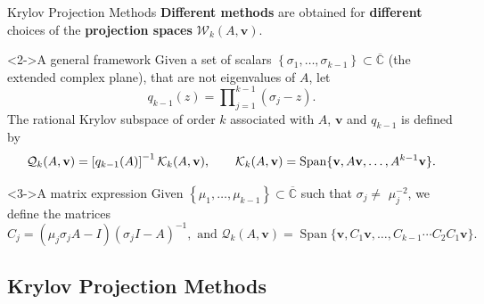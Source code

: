 \documentclass[aspectratio=169,xcolor=dvipsnames]{beamer}
\begin{document}
\begin{frame}{Krylov Projection Methods}
\textbf{Different methods} are obtained for \textbf{different} choices of the \textbf{projection spaces} $\mathcal{W}_{k}(A,\mathbf{v})
$.

\begin{block}<2->{A general framework}
Given a set of scalars $\left\{ \sigma _{1},\dots,\sigma _{k-1}\right\}
\subset \overline{\mathbb{C}}$ (the extended complex plane), that are not
eigenvalues of $A$, let
\begin{equation*}
q_{k-1}(z)=\prod\nolimits_{j=1}^{k-1}(\sigma _{j}-z).
\end{equation*}
The \alert{rational Krylov} subspace of order $k$ associated with $A$, $\mathbf{v%
}$ and $q_{k-1}$ is defined by%
\begin{equation*}
\mathcal{Q}_{k}(A,\mathbf{v})=\left[ q_{k-1}(A)\right] ^{-1}\mathcal{%
	K}_{k}(A,\mathbf{v}),
\qquad \mathcal{K}_{k}(A,\mathbf{v})=\operatorname{Span}\{\mathbf{v},A\mathbf{v}%
,\ldots ,A^{k-1}\mathbf{v}\}.
\end{equation*}
\end{block}

\begin{block}<3->{A matrix expression}
Given $\left\{ \mu _{1},\dots, \mu _{k-1}\right\} \subset \overline{\mathbb{C}}$
such that $\sigma _{j}\neq $ $\mu _{j}^{-2}$, we define the matrices
\begin{equation*}
C_{j}=\left( \mu _{j}\sigma _{j}A-I\right) (\sigma _{j}I-A)^{-1}, \text{ and } \mathcal{Q}_{k}(A,\mathbf{v})=\operatorname{Span}\{\mathbf{v},C_{1}\mathbf{v}%
,\ldots ,C_{k-1}\cdots C_2 C_{1}\mathbf{v}\}.
\end{equation*}
\end{block}

\end{frame}

\subsection{Krylov Projection Methods}
\end{document}
